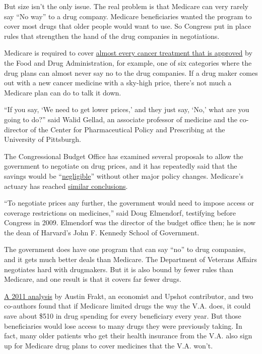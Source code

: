 But size isn't the only issue. The real problem is that Medicare can
very rarely say ``No way'' to a drug company. Medicare beneficiaries
wanted the program to cover most drugs that older people would want to
use. So Congress put in place rules that strengthen the hand of the drug
companies in negotiations.

Medicare is required to cover
\href{https://www.cms.gov/Medicare/Prescription-Drug-Coverage/PrescriptionDrugCovContra/downloads/chapter6.pdf\#page=23}{almost
every cancer treatment that is approved} by the Food and Drug
Administration, for example, one of six categories where the drug plans
can almost never say no to the drug companies. If a drug maker comes out
with a new cancer medicine with a sky-high price, there's not much a
Medicare plan can do to talk it down.

``If you say, `We need to get lower prices,' and they just say, `No,'
what are you going to do?'' said Walid Gellad, an associate professor of
medicine and the co-director of the Center for Pharmaceutical Policy and
Prescribing at the University of Pittsburgh.

The Congressional Budget Office has examined several proposals to allow
the government to negotiate on drug prices, and it has repeatedly said
that the savings would be
``\href{https://www.cbo.gov/sites/default/files/108th-congress-2003-2004/reports/03-03-wyden.pdf}{negligible}''
without other major policy changes. Medicare's actuary has reached
\href{https://www.cms.gov/Newsroom/MediaReleaseDatabase/Press-releases/2007-Press-releases-items/2007-01-11.html}{similar
conclusions}.

``To negotiate prices any further, the government would need to impose
access or coverage restrictions on medicines,'' said Doug Elmendorf,
testifying before Congress in 2009. Elmendorf was the director of the
budget office then; he is now the dean of Harvard's John F. Kennedy
School of Government.

The government does have one program that can say ``no'' to drug
companies, and it gets much better deals than Medicare. The Department
of Veterans Affairs negotiates hard with drugmakers. But it is also
bound by fewer rules than Medicare, and one result is that it covers far
fewer drugs.

\href{http://papers.ssrn.com/sol3/papers.cfm?abstract_id=1809665}{A 2011
analysis} by Austin Frakt, an economist and Upshot contributor, and two
co-authors found that if Medicare limited drugs the way the V.A. does,
it could save about \$510 in drug spending for every beneficiary every
year. But those beneficiaries would lose access to many drugs they were
previously taking. In fact, many older patients who get their health
insurance from the V.A. also sign up for Medicare drug plans to cover
medicines that the V.A. won't.

